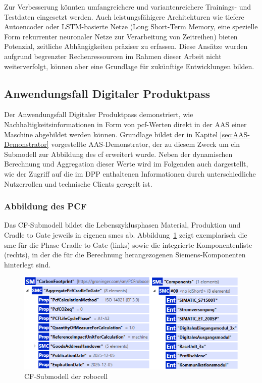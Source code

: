 Zur Verbesserung könnten umfangreichere und variantenreichere Trainings- und Testdaten eingesetzt werden. 
Auch leistungsfähigere Architekturen wie tiefere Autoencoder oder LSTM-basierte Netze (Long Short-Term Memory, eine spezielle Form rekurrenter neuronaler Netze zur Verarbeitung von Zeitreihen) bieten Potenzial, zeitliche Abhängigkeiten präziser zu erfassen.
Diese Ansätze wurden aufgrund begrenzter Rechenressourcen im Rahmen dieser Arbeit nicht weiterverfolgt, können aber eine Grundlage für zukünftige Entwicklungen bilden.

\newpage
\subsection{Anwendungsfall Digitaler Produktpass}
Der Anwendungsfall Digitaler Produktpass demonstriert, wie Nachhaltigkeitsinformationen in Form von \acs{pcf}-Werten direkt in der AAS einer Maschine abgebildet werden können.
Grundlage bildet der in Kapitel \ref{sec:AAS-Demonstrator} vorgestellte AAS-Demonstrator, der zu diesem Zweck um ein Submodell zur Abbildung des \acs{cf} erweitert wurde.
Neben der dynamischen Berechnung und Aggregation dieser Werte wird im Folgenden auch dargestellt, wie der Zugriff auf die im DPP enthaltenen Informationen durch unterschiedliche Nutzerrollen und technische Clients geregelt ist.

\subsubsection{Abbildung des PCF}
Das CF-Submodell bildet die Lebenszyklusphasen Material, Produktion und Cradle to Gate jeweils in eigenen \acsp{smc} ab.
Abbildung~\ref{fig:SubmodellCF} zeigt exemplarisch die \acs{smc} für die Phase Cradle to Gate (links) sowie die integrierte Komponentenliste (rechts), in der die für die Berechnung herangezogenen Siemens-Komponenten hinterlegt sind.

\begin{figure}[htbp]
    \centering
        \includegraphics[width=1\textwidth]{Bilder/Ergebnisse/DPP/SubmodellCF.png}
    \caption{CF-Submodell der robocell}
    \label{fig:SubmodellCF}
\end{figure}

